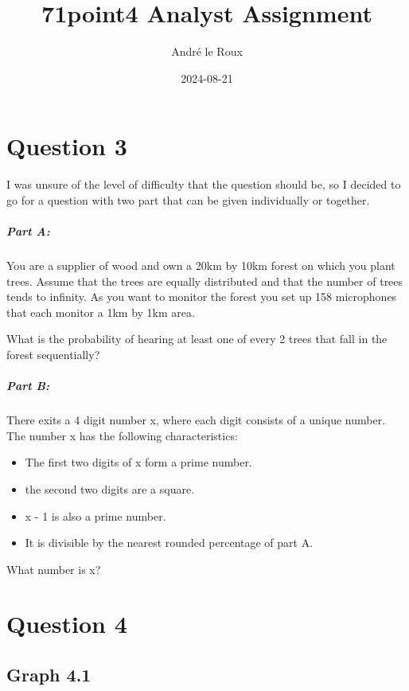 \documentclass[
  11pt,
]{article}
\title{71point4 Analyst Assignment}
\author{André le Roux}
\date{2024-08-21}
\providecommand{\tightlist}{%
  \setlength{\itemsep}{0pt}\setlength{\parskip}{0pt}}
\begin{document}
\maketitle

\hypertarget{question-3}{%
\section{Question 3}\label{question-3}}

I was unsure of the level of difficulty that the question should be, so
I decided to go for a question with two part that can be given
individually or together.

\hypertarget{part-a}{%
\subparagraph{Part A:}\label{part-a}}

You are a supplier of wood and own a 20km by 10km forest on which you
plant trees. Assume that the trees are equally distributed and that the
number of trees tends to infinity. As you want to monitor the forest you
set up 158 microphones that each monitor a 1km by 1km area.

What is the probability of hearing at least one of every 2 trees that
fall in the forest sequentially?

\hypertarget{part-b}{%
\subparagraph{Part B:}\label{part-b}}

There exits a 4 digit number x, where each digit consists of a unique
number. The number x has the following characteristics:

\begin{itemize}
\tightlist
\item
  The first two digits of x form a prime number.
\item
  the second two digits are a square.
\item
  x - 1 is also a prime number.
\item
  It is divisible by the nearest rounded percentage of part A.
\end{itemize}

What number is x?

\hypertarget{question-4}{%
\section{Question 4}\label{question-4}}

\hypertarget{graph-4.1}{%
\subsection{Graph 4.1}\label{graph-4.1}}
\end{document}

